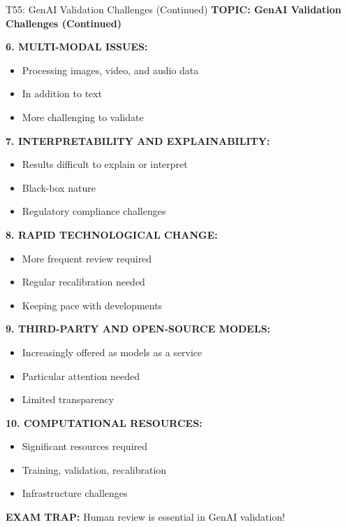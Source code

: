\documentclass[8pt]{beamer}
\begin{document}
	\begin{frame}{T55: GenAI Validation Challenges (Continued)}
		\fontsize{6.5}{7.5}\selectfont
		\textbf{TOPIC: GenAI Validation Challenges (Continued)}
		
		\vspace{0.1cm}
		\textbf{6. MULTI-MODAL ISSUES:}
		\begin{itemize}
			\item Processing images, video, and audio data
			\item In addition to text
			\item More challenging to validate
		\end{itemize}
		
		\vspace{0.1cm}
		\textbf{7. INTERPRETABILITY AND EXPLAINABILITY:}
		\begin{itemize}
			\item Results difficult to explain or interpret
			\item Black-box nature
			\item Regulatory compliance challenges
		\end{itemize}
		
		\vspace{0.1cm}
		\textbf{8. RAPID TECHNOLOGICAL CHANGE:}
		\begin{itemize}
			\item More frequent review required
			\item Regular recalibration needed
			\item Keeping pace with developments
		\end{itemize}
		
		\vspace{0.1cm}
		\textbf{9. THIRD-PARTY AND OPEN-SOURCE MODELS:}
		\begin{itemize}
			\item Increasingly offered as models as a service
			\item Particular attention needed
			\item Limited transparency
		\end{itemize}
		
		\vspace{0.1cm}
		\textbf{10. COMPUTATIONAL RESOURCES:}
		\begin{itemize}
			\item Significant resources required
			\item Training, validation, recalibration
			\item Infrastructure challenges
		\end{itemize}
		
		\textcolor{myred}{\textbf{EXAM TRAP:}} Human review is \textcolor{myblue}{essential in GenAI validation}!
	\end{frame}
	
\end{document}

